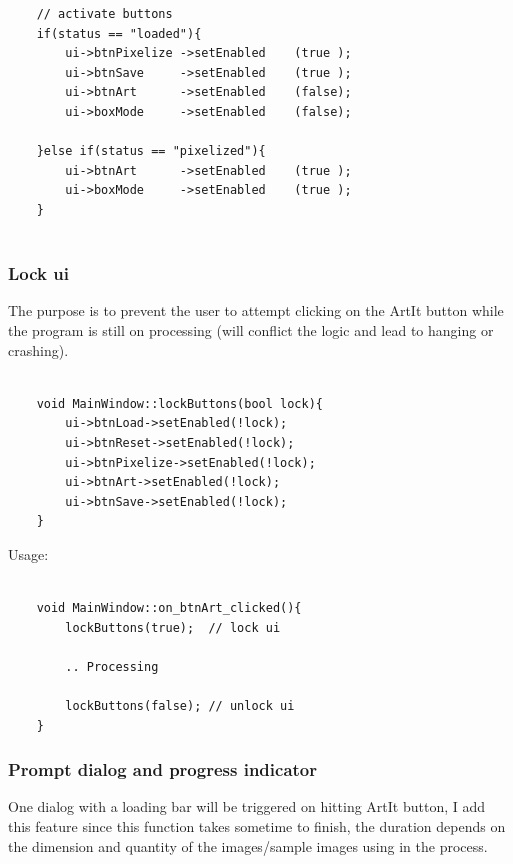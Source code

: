 \documentclass[english]{article}
\begin{document}
{\begin{lstlisting}
	// activate buttons
	if(status == "loaded"){
		ui->btnPixelize ->setEnabled    (true );
		ui->btnSave     ->setEnabled    (true );
		ui->btnArt      ->setEnabled    (false);
		ui->boxMode     ->setEnabled    (false);
		
	}else if(status == "pixelized"){
		ui->btnArt      ->setEnabled    (true );
		ui->boxMode     ->setEnabled    (true );
	}
	                           
\end{lstlisting}



\subsubsection{Lock ui}

 The purpose is to prevent the user to attempt clicking on the ArtIt button while the program is still on processing (will conflict the logic and lead to hanging or crashing). 

\lstset{language=C++}

\begin{lstlisting}

	void MainWindow::lockButtons(bool lock){
		ui->btnLoad->setEnabled(!lock);
		ui->btnReset->setEnabled(!lock);
		ui->btnPixelize->setEnabled(!lock);
		ui->btnArt->setEnabled(!lock);
		ui->btnSave->setEnabled(!lock);
	}

\end{lstlisting}

Usage:

\begin{lstlisting}

	void MainWindow::on_btnArt_clicked(){
		lockButtons(true);	// lock ui
		
		.. Processing
		
		lockButtons(false);	// unlock ui
	}
\end{lstlisting}



\subsubsection{Prompt dialog and progress indicator}

One dialog with a loading bar will be triggered on hitting ArtIt button, I add this feature since this function takes sometime to finish, the duration depends on the dimension and quantity of the images/sample images using in the process. \newline

}
\end{document}
